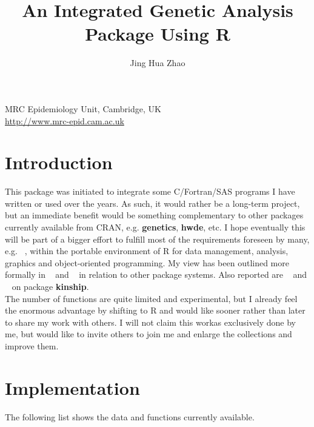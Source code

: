 \documentclass[11pt,a4paper]{article}
\begin{document}
\title{An Integrated Genetic Analysis Package Using R}
\author{Jing Hua Zhao}
\date{}
\maketitle

\begin{center}
MRC Epidemiology Unit, Cambridge, UK \\
\url{http://www.mrc-epid.cam.ac.uk}
\end{center}

\tableofcontents



\section{Introduction}

This package was initiated to integrate some C/Fortran/SAS programs I have written 
or used over the years. As such, it would rather be a long-term project, but an
immediate benefit would be something complementary to other packages currently
available from CRAN, e.g. {\bf genetics}, {\bf hwde}, etc. I hope eventually this will
be part of a bigger effort to fulfill most of the requirements foreseen by many, 
e.g. ~\cite{guo00}, within the portable environment of R for data management, 
analysis, graphics and object-oriented programming. My view has been outlined
more formally in ~\cite{zt06a} and ~\cite{zt06b} in relation to other package
systems. Also reported are ~\cite{zhao05} and ~\cite{zhao06} on package {\bf  kinship}.\\

The number of functions are quite limited and experimental, but I already feel
the enormous advantage by shifting to R and would like sooner rather than later
to share my work with others. I will not claim this workas exclusively done by
me, but would like to invite others to join me and enlarge the collections and
improve them.

\section{Implementation}

The following list shows the data and functions currently available.
\end{document}
